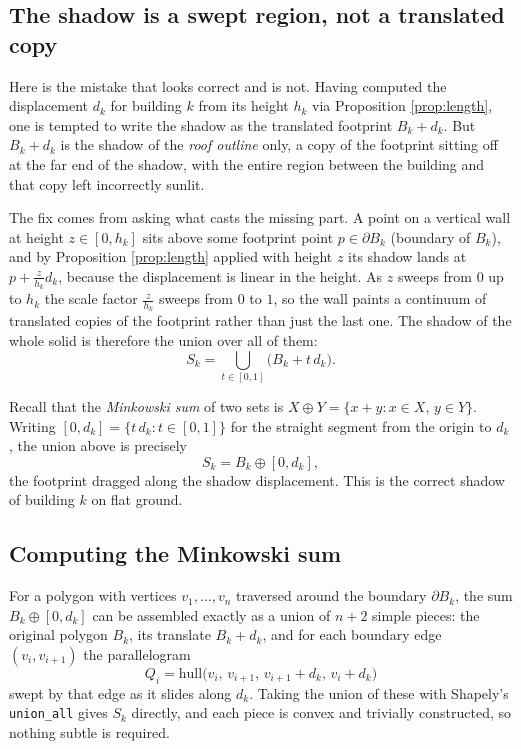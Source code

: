 \documentclass[11pt,a4paper]{article}
\theoremstyle{plain}
\theoremstyle{definition}
\theoremstyle{remark}
\begin{document}
\subsection{The shadow is a swept region, not a translated copy}

Here is the mistake that looks correct and is not. Having computed the displacement $d_k$ for building $k$ from its height $h_k$ via Proposition \ref{prop:length}, one is tempted to write the shadow as the translated footprint $B_k + d_k$. But $B_k + d_k$ is the shadow of the \emph{roof outline} only, a copy of the footprint sitting off at the far end of the shadow, with the entire region between the building and that copy left incorrectly sunlit.

The fix comes from asking what casts the missing part. A point on a vertical wall at height $z \in [0, h_k]$ sits above some footprint point $p \in \partial B_k$ (boundary of $B_k$), and by Proposition \ref{prop:length} applied with height $z$ its shadow lands at $\displaystyle p + \frac{z}{h_k} d_k$, because the displacement is linear in the height. As $z$ sweeps from $0$ up to $h_k$ the scale factor $\frac{z}{h_k}$ sweeps from $0$ to $1$, so the wall paints a continuum of translated copies of the footprint rather than just the last one. The shadow of the whole solid is therefore the union over all of them:
$$S_k = \bigcup_{t \in [0,1]} \big(B_k + t\,d_k\big).$$

Recall that the \emph{Minkowski sum} of two sets is $X \oplus Y = \{x + y : x \in X,\, y \in Y\}$. Writing $[0, d_k] = \{t\,d_k : t \in [0,1]\}$ for the straight segment from the origin to $d_k$, the union above is precisely
$$S_k = B_k \oplus [0, d_k],$$
the footprint dragged along the shadow displacement. This is the correct shadow of building $k$ on flat ground.

\subsection{Computing the Minkowski sum}

For a polygon with vertices $v_1, \dots, v_n$ traversed around the boundary $\partial B_k$, the sum $B_k \oplus [0,d_k]$ can be assembled exactly as a union of $n + 2$ simple pieces: the original polygon $B_k$, its translate $B_k + d_k$, and for each boundary edge $(v_i, v_{i+1})$ the parallelogram
$$Q_i = \mathrm{hull}\big(v_i, \,  v_{i+1}, \,  v_{i+1} + d_k, \,  v_i + d_k\big)$$
swept by that edge as it slides along $d_k$. Taking the union of these with Shapely's \texttt{union\_all} gives $S_k$ directly, and each piece is convex and trivially constructed, so nothing subtle is required.
\end{document}
